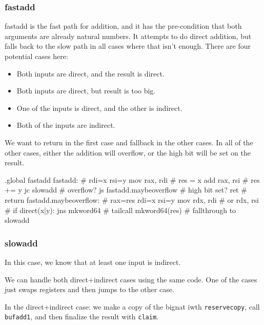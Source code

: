 \subsubsection{fastadd}

fastadd is the fast path for addition, and it has the pre-condition
that both arguments are already natural numbers.  It attempts to do
direct addition, but falls back to the slow path in all cases where that
isn't enough.  There are four potential cases here:

\begin{itemize}
\item Both inputs are direct, and the result is direct.
\item Both inputs are direct, but result is too big.
\item One of the inputs is direct, and the other is indirect.
\item Both of the inputs are indirect.
\end{itemize}

We want to return in the first case and fallback in the other cases.
In all of the other cases, either the addition will overflow, or the
high bit will be set on the result.

\begin{asm}
.global fastadd
fastadd:                                    # rdi=x rsi=y
	mov	rax, rdi                    #   res = x
	add	rax, rsi                    #   res += y
	jc	slowadd                     #   overflow?
	js	fastadd.maybeoverflow       #   high bit set?
	ret                                 #   return
fastadd.maybeoverflow:                      # rax=res rdi=x rsi=y
	mov	rdx, rdi                    #
	or	rdx, rsi                    #   if direct(x|y):
	jns	mkword64                    #     tailcall mkword64(res)
	# fallthrough to slowadd
\end{asm}

\subsubsection{slowadd}

In this case, we know that at least one input is indirect.

We can handle both direct+indirect cases using the same code.  One of
the cases just swaps registers and then jumps to the other case.

In the direct+indirect case: we make a copy of the bignat iwth
\lstinline|reservecopy|, call \lstinline|bufadd1|, and then finalize
the result with \lstinline|claim|.

